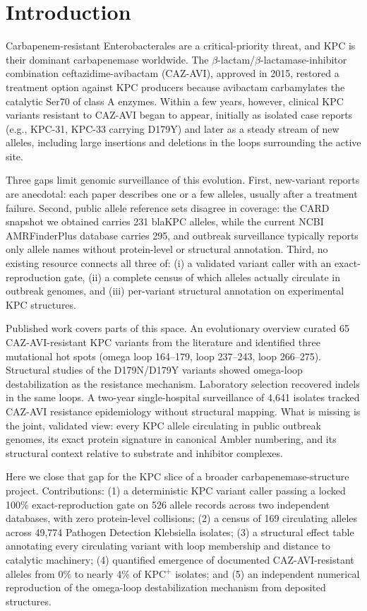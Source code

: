 \documentclass[11pt]{article}
\begin{document}
\section{Introduction}
Carbapenem-resistant Enterobacterales are a critical-priority threat, and KPC is their dominant carbapenemase worldwide. The $\beta$-lactam/$\beta$-lactamase-inhibitor combination ceftazidime-avibactam (CAZ-AVI), approved in 2015, restored a treatment option against KPC producers because avibactam carbamylates the catalytic Ser70 of class A enzymes. Within a few years, however, clinical KPC variants resistant to CAZ-AVI began to appear, initially as isolated case reports (e.g., KPC-31, KPC-33 carrying D179Y) and later as a steady stream of new alleles, including large insertions and deletions in the loops surrounding the active site.

Three gaps limit genomic surveillance of this evolution. First, new-variant reports are anecdotal: each paper describes one or a few alleles, usually after a treatment failure. Second, public allele reference sets disagree in coverage: the CARD snapshot we obtained carries 231 blaKPC alleles, while the current NCBI AMRFinderPlus database carries 295, and outbreak surveillance typically reports only allele names without protein-level or structural annotation. Third, no existing resource connects all three of: (i) a validated variant caller with an exact-reproduction gate, (ii) a complete census of which alleles actually circulate in outbreak genomes, and (iii) per-variant structural annotation on experimental KPC structures.

Published work covers parts of this space. An evolutionary overview curated 65 CAZ-AVI-resistant KPC variants from the literature and identified three mutational hot spots (omega loop 164--179, loop 237--243, loop 266--275). Structural studies of the D179N/D179Y variants showed omega-loop destabilization as the resistance mechanism. Laboratory selection recovered indels in the same loops. A two-year single-hospital surveillance of 4,641 isolates tracked CAZ-AVI resistance epidemiology without structural mapping. What is missing is the joint, validated view: every KPC allele circulating in public outbreak genomes, its exact protein signature in canonical Ambler numbering, and its structural context relative to substrate and inhibitor complexes.

Here we close that gap for the KPC slice of a broader carbapenemase-structure project. Contributions: (1) a deterministic KPC variant caller passing a locked 100\% exact-reproduction gate on 526 allele records across two independent databases, with zero protein-level collisions; (2) a census of 169 circulating alleles across 49,774 Pathogen Detection Klebsiella isolates; (3) a structural effect table annotating every circulating variant with loop membership and distance to catalytic machinery; (4) quantified emergence of documented CAZ-AVI-resistant alleles from 0\% to nearly 4\% of KPC$^+$ isolates; and (5) an independent numerical reproduction of the omega-loop destabilization mechanism from deposited structures.
\end{document}
